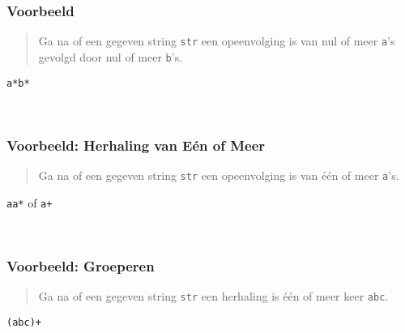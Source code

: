 \begin{frame}
  \frametitle{Voorbeeld}
  \begin{quote}
    Ga na of een gegeven string \texttt{str}
    een opeenvolging is van nul of meer \texttt{a}'s gevolgd door nul of meer \texttt{b}'s.
  \end{quote}
  \vskip2mm
  \begin{center}
    \texttt{a*b*}
  \end{center}
  \vskip2mm
  \begin{matchexamples}
    \match{}
    \\[2mm]
  \end{matchexamples}
\end{frame}

\begin{frame}
  \frametitle{Voorbeeld: Herhaling van E\'en of Meer}
  \begin{quote}
    Ga na of een gegeven string \texttt{str}
    een opeenvolging is van \'e\'en of meer \texttt{a}'s.
  \end{quote}
  \vskip2mm
  \begin{center}
    \texttt{aa*} \hspace{2mm} of \hspace{2mm} \texttt{a+}
  \end{center}
  \vskip2mm
  \begin{matchexamples}
    \\[2mm]
    \mismatch{}
  \end{matchexamples}
\end{frame}

\begin{frame}
  \frametitle{Voorbeeld: Groeperen}
  \begin{quote}
    Ga na of een gegeven string \texttt{str}
    een herhaling is \'e\'en of meer keer \texttt{abc}.
  \end{quote}
  \vskip2mm
  \begin{center}
    \texttt{(abc)+}
  \end{center}
  \begin{matchexamples}
    \\[2mm]
    \mismatch{}
  \end{matchexamples}
\end{frame}

